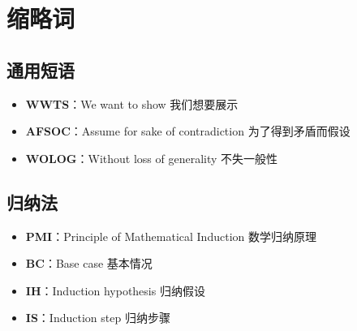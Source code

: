 \section{缩略词}

\subsection{通用短语}

\begin{itemize}
    \item \textbf{WWTS}：We want to show 我们想要展示
    \item \textbf{AFSOC}：Assume for sake of contradiction 为了得到矛盾而假设
    \item \textbf{WOLOG}：Without loss of generality 不失一般性
\end{itemize}

\subsection{归纳法}

\begin{itemize}
    \item \textbf{PMI}：Principle of Mathematical Induction 数学归纳原理
    \item \textbf{BC}：Base case 基本情况
    \item \textbf{IH}：Induction hypothesis 归纳假设
    \item \textbf{IS}：Induction step 归纳步骤
\end{itemize}